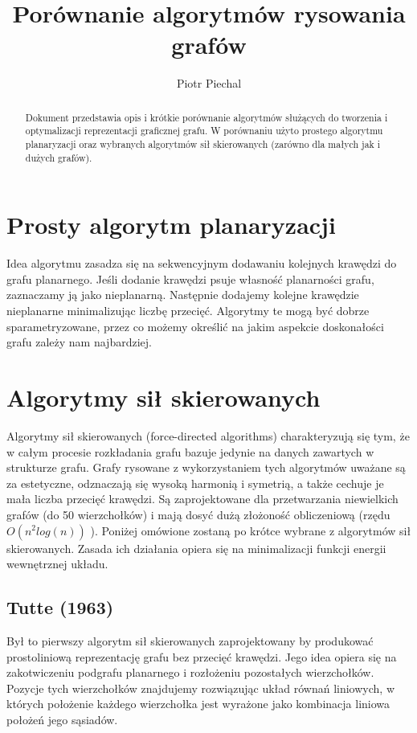 \documentclass[a4paper,11pt]{article}
\title{Porównanie algorytmów rysowania grafów}
\author{Piotr Piechal}
\begin{document}
\maketitle
\tableofcontents

\begin{abstract}
Dokument przedstawia opis i krótkie porównanie algorytmów służących do tworzenia i optymalizacji reprezentacji graficznej grafu. W porównaniu użyto prostego algorytmu planaryzacji oraz wybranych algorytmów sił skierowanych (zarówno dla małych jak i dużych grafów).
\end{abstract}

\section{Prosty algorytm planaryzacji}
Idea algorytmu zasadza się na sekwencyjnym dodawaniu kolejnych krawędzi do grafu planarnego. Jeśli dodanie krawędzi psuje własność planarności grafu, zaznaczamy ją jako nieplanarną. Następnie dodajemy kolejne krawędzie nieplanarne minimalizując liczbę przecięć. Algorytmy te mogą być dobrze sparametryzowane, przez co możemy określić na jakim aspekcie doskonałości grafu zależy nam najbardziej.

\section{Algorytmy sił skierowanych}
Algorytmy sił skierowanych (force-directed algorithms) charakteryzują się tym, że w całym procesie rozkładania grafu bazuje jedynie na danych zawartych w strukturze grafu. Grafy rysowane z wykorzystaniem tych algorytmów uważane są za estetyczne, odznaczają się wysoką harmonią i symetrią, a także cechuje je mała liczba przecięć krawędzi. Są zaprojektowane dla przetwarzania niewielkich grafów (do 50 wierzchołków) i mają dosyć dużą złożoność obliczeniową (rzędu $ O(n^2 log(n) ) $ ). Poniżej omówione zostaną po krótce wybrane z algorytmów sił skierowanych. Zasada ich działania opiera się na minimalizacji funkcji energii wewnętrznej układu.

\subsection{Tutte (1963)}
Był to pierwszy algorytm sił skierowanych zaprojektowany by produkować prostoliniową reprezentację grafu bez przecięć krawędzi. Jego idea opiera się na zakotwiczeniu podgrafu planarnego i rozłożeniu pozostałych wierzchołków. Pozycje tych wierzchołków znajdujemy rozwiązując układ równań liniowych, w których położenie każdego wierzchołka jest wyrażone jako kombinacja liniowa położeń jego sąsiadów.
\end{document}
